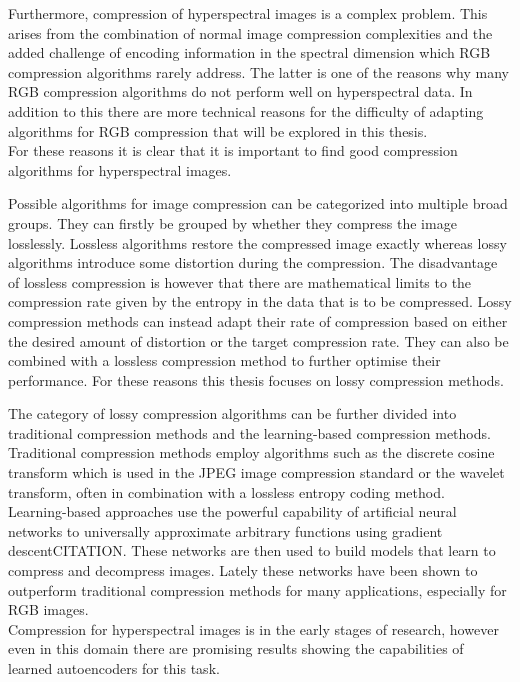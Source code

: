 Furthermore, compression of hyperspectral images is a complex problem. This arises from the combination of normal image compression complexities and the added challenge of encoding information in the spectral dimension which RGB compression algorithms rarely address. The latter is one of the reasons why many RGB compression algorithms do not perform well on hyperspectral data. In addition to this there are more technical reasons for the difficulty of adapting algorithms for RGB compression that will be explored in this thesis.\\
For these reasons it is clear that it is important to find good compression algorithms for hyperspectral images.

Possible algorithms for image compression can be categorized into multiple broad groups. They can firstly be grouped by whether they compress the image losslessly. Lossless algorithms restore the compressed image exactly whereas lossy algorithms introduce some distortion during the compression. The disadvantage of lossless compression is however that there are mathematical limits to the compression rate given by the entropy in the data that is to be compressed. Lossy compression methods can instead adapt their rate of compression based on either the desired amount of distortion or the target compression rate. They can also be combined with a lossless compression method to further optimise their performance. For these reasons this thesis focuses on lossy compression methods.

The category of lossy compression algorithms can be further divided into traditional compression methods and the learning-based compression methods. Traditional compression methods employ algorithms such as the discrete cosine transform which is used in the JPEG image compression standard or the wavelet transform, often in combination with a lossless entropy coding method.\\
Learning-based approaches use the powerful capability of artificial neural networks to universally approximate arbitrary functions using gradient descentCITATION. These networks are then used to build models that learn to compress and decompress images. Lately these networks have been shown to outperform traditional compression methods for many applications, especially for RGB images.\\
Compression for hyperspectral images is in the early stages of research, however even in this domain there are promising results showing the capabilities of learned autoencoders for this task.


